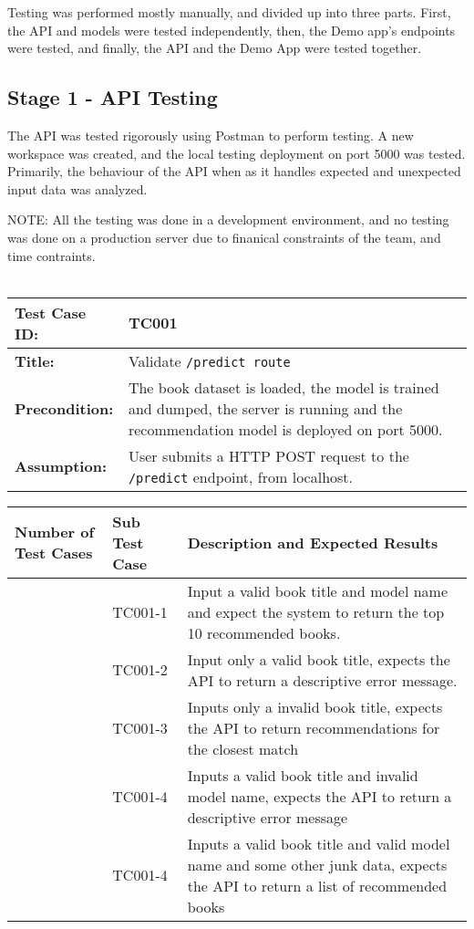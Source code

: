 Testing was performed mostly manually, and divided up into three parts. First, the API and models were tested independently, then, the Demo app's endpoints were tested, and finally, the API and the Demo App were tested together.

\subsection*{Stage 1 - API Testing}

The API was tested rigorously using Postman to perform testing. A new workspace was created, and the local testing deployment on port 5000 was tested. Primarily, the behaviour of the API when as it handles expected and unexpected input data was analyzed.

NOTE: All the testing was done in a development environment, and no testing was done on a production server due to finanical constraints of the team, and time contraints.
\\\\

\noindent
\begin{tabularx}{\textwidth}{|>{\raggedright\arraybackslash}p{4cm}|X|}
    \hline
    \textbf{Test Case ID:} & TC001 \\ \hline
    \textbf{Title:} & Validate \texttt{/predict route} \\ \hline
    \textbf{Precondition:} & The book dataset is loaded, the model is trained and dumped, the server is running and the recommendation model is deployed on port 5000. \\ \hline
    \textbf{Assumption:} & User submits a HTTP POST request to the \texttt{/predict} endpoint, from localhost. \\ \hline
\end{tabularx}

\noindent
\begin{tabularx}{\textwidth}{|>{\centering\arraybackslash}p{3cm}|>{\centering\arraybackslash}p{3cm}|X|}
    \hline
    \textbf{Number of Test Cases} & \textbf{Sub Test Case} & \textbf{Description and Expected Results} \\ \hline
    1 & TC001-1 & Input a valid book title and model name and expect the system to return the top 10 recommended books. \\ \hline
    2 & TC001-2 & Input only a valid book title, expects the API to return a descriptive error message. \\ \hline
    3 & TC001-3 & Inputs only a invalid book title, expects the API to return recommendations for the closest match \\ \hline
    4 & TC001-4 & Inputs a valid book title and invalid model name, expects the API to return a descriptive error message \\ \hline
    5 & TC001-4 & Inputs a valid book title and valid model name and some other junk data, expects the API to return a list of recommended books \\ \hline
\end{tabularx}

